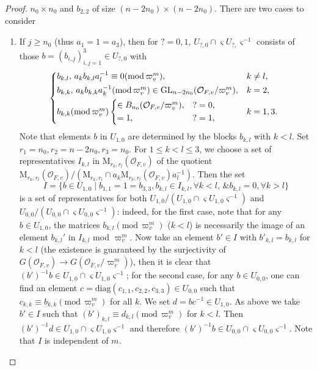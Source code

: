 \documentclass[12pt,oneside,reqno]{amsart}
\theoremstyle{plain}
\begin{document}
\begin{proof}
		$n_0\times n_0$
		and
		$b_{2,2}$ of size
		$(n-2n_0)\times(n-2n_0)$.
		There are two cases to consider
		\begin{enumerate}
			\item 
			If $j\geq n_0$
			(thus $a_1=1=a_3$),
			then for $?=0,1$,
			$U_{?,0}\cap
			\varsigma U_{?,}\varsigma^{-1}$
			consists of those
			$b=(b_{i,j})_{i,j=1}^3\in U_{?,0}$ with
			\[
			\begin{cases*}
				b_{k,l},\,
				a_kb_{k,l}a_l^{-1} 
				\equiv
				0
				(\mathrm{mod}\,\varpi_v^m),
				&
				$k\neq l$,
				\\
				b_{k,k},\,
				a_kb_{k,k}a_k^{-1}
				(\mathrm{mod}\,\varpi_v^m)
				\in
				\mathrm{GL}_{n-2n_0}(\mathcal{O}_{F,v}/\varpi_v^m),
				&
				$k=2$,
				\\
				b_{k,k}
				(\mathrm{mod}\,\varpi_v^m)
				\begin{cases*}
					\in
					B_{n_0}
					(\mathcal{O}_{F,v}/\varpi_v^m),
					&
					$?=0$,
					\\
					=1,
					&
					$?=1$,
				\end{cases*}
				&
				$k=1,3$.
			\end{cases*}
			\]
			Note that elements $b$ in
			$U_{1,0}$
			are determined by the blocks
			$b_{k,l}$
			with
			$k<l$.
			Set
			$r_1=n_0,r_2=n-2n_0,r_3=n_0$.
			For $1\leq k<l\leq3$,
			we choose a set of representatives
			$I_{k,l}$ in
			$\mathrm{M}_{r_k,r_l}
			(\mathcal{O}_{F,v})$
			of the quotient
			$\mathrm{M}_{r_k,r_l}
			(\mathcal{O}_{F,v})/
			(\mathrm{M}_{r_k,r_l}\cap
			a_k\mathrm{M}_{r_k,r_l}(\mathcal{O}_{F,v})a_l^{-1})$.
			Then the set
			\begin{equation}\label{set of representatives-1}
				I=
				\big\{
				b\in U_{1,0}\mid 
				b_{1,1}=1=b_{3,3},
				b_{k,l}\in I_{k,l},
				\forall k<l,
				\,
				\&
				b_{k,l}=0,
				\forall
				k>l
				\big\}
			\end{equation}
			is a set of representatives for both
			$U_{1,0}/(U_{1,0}\cap
			\varsigma U_{1,0}\varsigma^{-1})$	
			and
			$U_{0,0}/(U_{0,0}\cap
			\varsigma U_{0,0}\varsigma^{-1})$:
			indeed, for the first case,
			note that
			for any
			$b\in
			U_{1,0}$,
			the matrices
			$b_{k,l}
			(\mathrm{mod}\,\varpi_v^m)$
			($k<l$)
			is necessarily the image of an element
			$b_{k,l}'$ in
			$I_{k,l}$
			mod $\varpi_v^m$.
			Now take an element
			$b'\in I$
			with
			$b'_{k,l}=b_{k,l}$
			for $k<l$
			(the existence is guaranteed by the surjectivity of
			$G(\mathcal{O}_{F,v})
			\rightarrow
			G(\mathcal{O}_{F,v}/\varpi_v^m)$),
			then it is clear that
			$(b')^{-1}b\in
			U_{1,0}\cap
			\varsigma U_{1,0}\varsigma^{-1}$;
			for the second case,
			for any $b\in U_{0,0}$,
			one can find an element
			$c=\mathrm{diag}(c_{1,1},c_{2,2},c_{3,3})
			\in
			U_{0,0}$
			such that
			$c_{k,k}
			\equiv
			b_{k,k}
			(\mathrm{mod}\,\varpi_v^m)$
			for all $k$.
			We set
			$d=bc^{-1}
			\in
			U_{1,0}$.
			As above we take
			$b'\in I$
			such that
			$(b')_{k,l}\equiv
			d_{k,l}
			(\mathrm{mod}\,\varpi_v^m)$
			for $k<l$.
			Then
			$(b')^{-1}d\in
			U_{1,0}
			\cap
			\varsigma
			U_{1,0}\varsigma^{-1}$
			and therefore
			$(b')^{-1}b\in
			U_{0,0}\cap
			\varsigma U_{0,0}\varsigma^{-1}$.
			Note that
			$I$ is independent of $m$.
			

\end{enumerate}
\end{proof}
\end{document}
